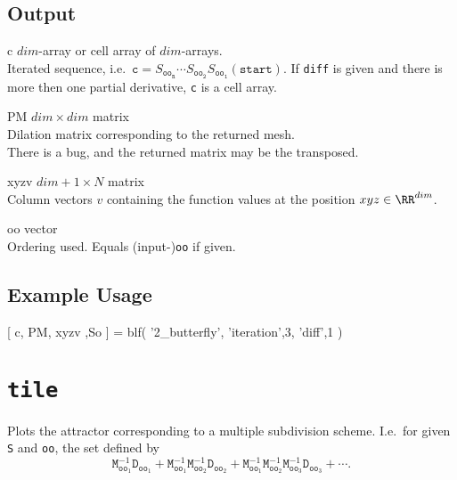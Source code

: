\subsection*{Output}
\begin{param}
\item[c] $dim$-array or cell array of $dim$-arrays.\\
Iterated sequence, i.e.\ $\texttt{c}=
S_{\texttt{oo}_\texttt{n}}
\cdots
S_{\texttt{oo}_\texttt{2}}
S_{\texttt{oo}_\texttt{1}}
(\texttt{start})$.    
If \texttt{diff} is given and there is more then one partial derivative, \texttt{c} is a cell array.

\item[PM] $dim\times dim$ matrix\\Dilation matrix corresponding to the returned mesh.\\
{\color{red} There is a bug, and the returned matrix may be the transposed.}

\item[xyzv] $dim + 1 \times N$ matrix\\
Column vectors $v$ containing the function values at the position $xyz\in\RR^{dim}$.

\item[oo] vector\\ Ordering used. Equals (input-)\texttt{oo} if given.
\end{param}

\subsection*{Example Usage}
\begin{param}
\item[{[ c, PM, xyzv ,So ] = blf( '2\_butterfly', 'iteration',3, 'diff',1 )}]
\end{param}

\section{\texttt{tile}}
Plots the attractor corresponding to a multiple subdivision scheme. I.e.\ for given \texttt{S} and \texttt{oo}, the set defined by
\begin{equation*}
\texttt{M}_{\texttt{oo}_1}^{-1}\texttt{D}_{\texttt{oo}_1}+
\texttt{M}_{\texttt{oo}_1}^{-1}\texttt{M}_{\texttt{oo}_{2}}^{-1}\texttt{D}_{\texttt{oo}_2}+
\texttt{M}_{\texttt{oo}_1}^{-1}\texttt{M}_{\texttt{oo}_{2}}^{-1}\texttt{M}_{\texttt{oo}_{3}}^{-1}\texttt{D}_{\texttt{oo}_3}+
\cdots.
\end{equation*}

